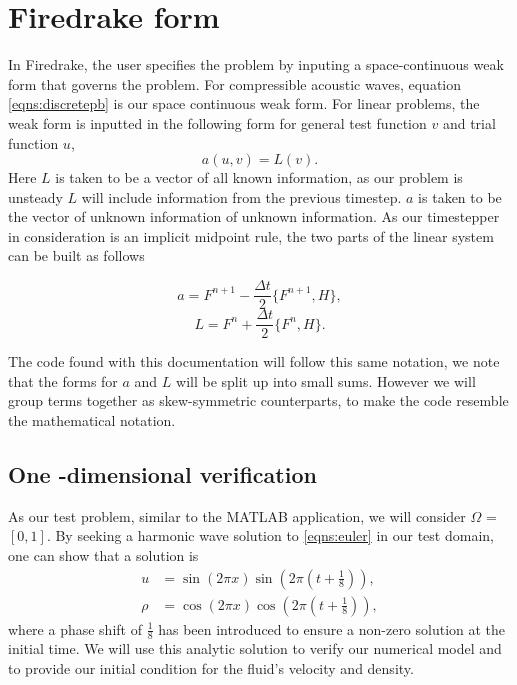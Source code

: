 \documentclass[a4paper,11pt]{article}
\begin{document}
\section{Firedrake form}

In Firedrake, the user specifies the problem by inputing a space-continuous weak form that governs the problem. For compressible acoustic waves, equation \eqref{eqns:discretepb} is our space continuous weak form. For linear problems, the weak form is inputted in the following form for general test function $v$ and trial function $u$,
\[ a(u,v) = L(v).\]
Here $L$ is taken to be a vector of all known information, as our problem is unsteady $L$ will include information from the previous timestep. $a$ is taken to be the vector of unknown information of unknown information. As our timestepper in consideration is an implicit midpoint rule, the two parts of the linear system can be built as follows

\[ a = F^{n+1} - \frac{\Delta t}{2} \{ F^{n+1} , H\} ,\]
\[ L = F^{n} + \frac{\Delta t}{2} \{ F^{n} , H\}. \]

The code found with this documentation will follow this same notation, we note that the forms for $a$ and $L$ will be split up into small sums. However we will group terms together as skew-symmetric counterparts, to make the code resemble the mathematical notation. 

\subsection{One -dimensional verification}

As our test problem, similar to the MATLAB application, we will consider $\Omega$ = $[0,1]$. 
By seeking a harmonic wave solution to \eqref{eqns:euler} in our test domain, one can show that a solution is 
\begin{equation*}
\begin{aligned}
u &=  \sin(2\pi x )\sin(2\pi(t+\frac{1}{8})),\\
\rho &=  \cos(2\pi x) \cos(2\pi (t + \frac{1}{8})),
\end{aligned}
\end{equation*}
where a phase shift of $\frac{1}{8}$ has been introduced to ensure a non-zero solution at the initial time. We will use this analytic solution to verify our numerical model and to provide our initial condition for the fluid's velocity and density.
\end{document}
